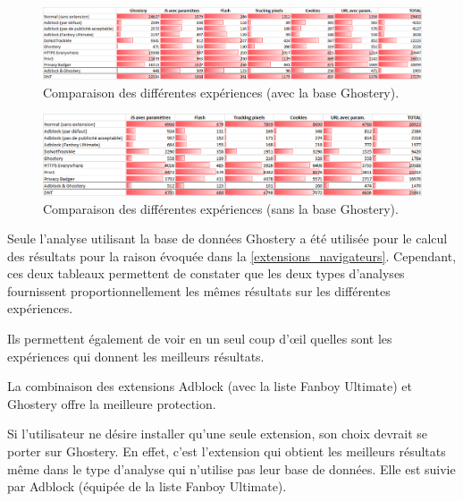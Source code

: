 \begin{figure}[!h]
	\hspace{-2cm}
	\includegraphics[scale=.54]{resultats/ANALYSES/Images/Comparaisons-Ghostery.png}
	\caption{\label{comparaisons-ghostery}Comparaison des différentes expériences (avec la base Ghostery).}
\end{figure}

\begin{figure}[!h]
	\hspace{-2cm}
	\includegraphics[scale=.6]{resultats/ANALYSES/Images/Comparaisons-NoG.png}
	\caption{\label{comparaisons-nog}Comparaison des différentes expériences (sans la base Ghostery).}
\end{figure}

Seule l'analyse utilisant la base de données Ghostery a été utilisée pour le calcul des résultats pour la raison évoquée dans la \autoref{extensions_navigateurs}. Cependant, ces deux tableaux permettent de constater que les deux types d'analyses fournissent proportionnellement les mêmes résultats sur les différentes expériences.
\newline

Ils permettent également de voir en un seul coup d'\oe{}il quelles sont les expériences qui donnent les meilleurs résultats.

La combinaison des extensions Adblock (avec la liste Fanboy Ultimate) et Ghostery offre la meilleure protection.

Si l'utilisateur ne désire installer qu'une seule extension, son choix devrait se porter sur Ghostery.
En effet, c'est l'extension qui obtient les meilleurs résultats même dans le type d'analyse qui n'utilise pas leur base de données. Elle est suivie par Adblock (équipée de la liste Fanboy Ultimate).

